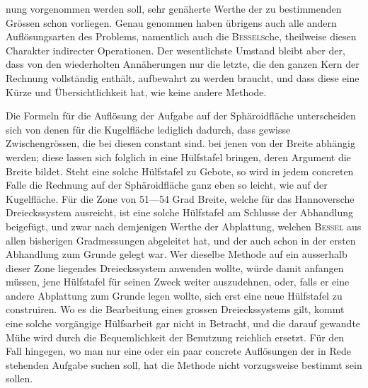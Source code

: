 %
nung vorgenommen werden soll, sehr genäherte Werthe der zu bestimmenden Grössen schon vorliegen. Genau genommen haben übrigens auch alle andern Auflösungsarten des Problems, namentlich auch die \textsc{Bessels}che, theilweise diesen Charakter indirecter Operationen. Der wesentlichste Umstand bleibt aber der, dass von den wiederholten Annäherungen nur die letzte, die den ganzen Kern der Rechnung vollständig enthält, aufbewahrt zu werden braucht, und dass diese eine Kürze und Übersichtlichkeit hat, wie keine andere Methode.

Die Formeln für die Auflösung der Aufgabe auf der Sphäroidfläche unterscheiden sich von denen für die Kugelfläche lediglich dadurch, dass gewisse Zwischengrössen, die bei diesen constant sind. bei jenen von der Breite abhängig werden; diese lassen sich folglich in eine Hülfstafel bringen, deren Argument die Breite bildet. Steht eine solche Hülfstafel zu Gebote, so wird in jedem concreten Falle die Rechnung auf der Sphäroidfläche ganz eben so leicht, wie auf der Kugelfläche. Für die Zone von 51---54 Grad Breite, welche für das Hannoversche Dreieckssystem ausreicht, ist eine solche Hülfstafel am Schlusse der Abhandlung beigefügt, und zwar nach demjenigen Werthe der Abplattung, welchen \textsc{Bessel} aus allen bisherigen Gradmessungen abgeleitet hat, und der auch schon in der ersten Abhandlung zum Grunde gelegt war. Wer dieselbe Methode auf ein ausserhalb dieser Zone liegendes Dreieckssystem anwenden wollte, würde damit anfangen müssen, jene Hülfstafel für seinen Zweck weiter auszudehnen, oder, falls er eine andere Abplattung zum Grunde legen wollte, sich erst eine neue Hülfstafel zu construiren. Wo es die Bearbeitung eines grossen Dreieckssystems gilt, kommt eine solche vorgängige Hülfsarbeit gar nicht in Betracht, und die darauf gewandte Mühe wird durch die Bequemlichkeit der Benutzung reichlich ersetzt. Für den Fall hingegen, wo man nur eine oder ein paar concrete Auflösungen der in Rede stehenden Aufgabe suchen soll, hat die Methode nicht vorzugsweise bestimmt sein sollen.
